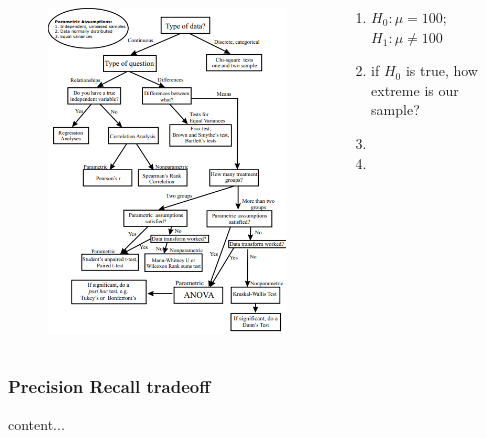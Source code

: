 \documentclass{beamer}
\begin{document}
\begin{frame}[plain]
\begin{columns}
\begin{column}{0.72\textwidth}
\begin{figure}
\includegraphics[scale=0.54]{statisticaltest}
\end{figure}
\end{column}
\begin{column}{0.3\textwidth}
\begin{enumerate}
\item $H_0: \mu=100$; $H_1: \mu \ne 100$
\item if $H_0$ is true, how extreme is our sample?
\item 
\item 
\end{enumerate}
\end{column}
\end{columns}
\end{frame}


\begin{frame}\frametitle{Precision Recall tradeoff}
content...
\end{frame}
\end{document}
